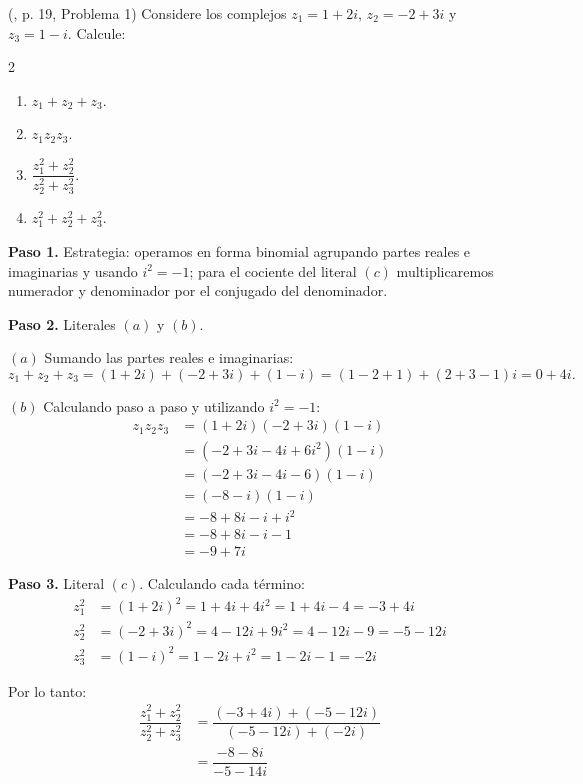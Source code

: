 \begin{example} (\cite{andreescu2014complex}, p. 19, Problema 1) Considere los complejos $z_1=1+2i$, $z_2=-2+3i$ y $z_3=1-i$. Calcule:
\begin{multicols}{2}
\begin{enumerate}[$(a)$]
\item $z_1+z_2+z_3$.
\item $z_1z_2z_3$.
\item $\dfrac{z_1^2 + z_2^2}{z_2^2+z_3^2}$.
\item $z_1^2 + z_2^2 +z_3^2$.
\end{enumerate}
\end{multicols}
\begin{myproof}
\textbf{Paso 1.} Estrategia: operamos en forma binomial agrupando partes reales e imaginarias y usando $i^2=-1$; para el cociente del literal $(c)$ multiplicaremos numerador y denominador por el conjugado del denominador.

\textbf{Paso 2.} Literales $(a)$ y $(b)$.

$(a)$ Sumando las partes reales e imaginarias:
\begin{equation}
z_1+z_2+z_3 = (1+2i)+(-2+3i)+(1-i)=(1-2+1)+(2+3-1)i= \boxed{0+4i}.
\end{equation}

$(b)$ Calculando paso a paso y utilizando $i^2=-1$:
\begin{align*}
z_1z_2z_3 &= (1+2i)(-2+3i)(1-i)\\
&= (-2+3i-4i+6i^2)(1-i)\\
&= (-2+3i-4i-6)(1-i)\\
&= (-8-i)(1-i)\\
&= -8+8i-i+i^2\\
&= -8+8i-i-1\\
&= \boxed{-9+7i}
\end{align*}

\textbf{Paso 3.} Literal $(c)$. Calculando cada término:
\begin{align*}
z_1^2 &= (1+2i)^2 = 1+4i+4i^2 = 1+4i-4 = -3+4i\\
z_2^2 &= (-2+3i)^2 = 4-12i+9i^2 = 4-12i-9 = -5-12i\\
z_3^2 &= (1-i)^2 = 1-2i+i^2 = 1-2i-1 = -2i
\end{align*}

Por lo tanto:
\begin{align*}
\dfrac{z_1^2 + z_2^2}{z_2^2+z_3^2} &= \dfrac{(-3+4i) + (-5-12i)}{(-5-12i)+(-2i)}\\
&= \dfrac{-8-8i}{-5-14i}\\
\end{align*}


\end{myproof}
\end{example}
